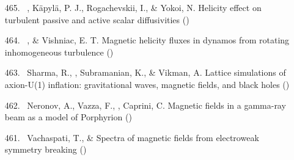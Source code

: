 \begin{itemize}
\item[{465.}~]
\Brandenburg, K\"apyl\"a, P. J., Rogachevskii, I., \& Yokoi, N.
{Helicity effect on turbulent passive and active scalar diffusivities}
()

\item[{464.}~]
\Brandenburg, \& Vishniac, E. T.
{Magnetic helicity fluxes in dynamos from rotating inhomogeneous turbulence}
()

\item[{463.}~]
Sharma, R., \Brandenburg, Subramanian, K., \& Vikman, A.
{Lattice simulations of axion-U(1) inflation: gravitational waves, magnetic fields, and black holes}
()

\item[{462.}~]
Neronov, A., Vazza, F., \Brandenburg, Caprini, C.
{Magnetic fields in a gamma-ray beam as a model of Porphyrion}
()

\end{itemize}

\begin{itemize}

\item[{461.}~]
Vachaspati, T., \& \Brandenburg{}
{Spectra of magnetic fields from electroweak symmetry breaking}
()

\end{itemize}



